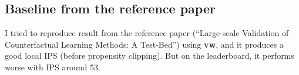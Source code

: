\documentclass[12pt]{article}
\begin{document}
\subsection{Baseline from the reference paper}
I tried to reproduce result from the reference paper (``Large-scale Validation of Counterfactual Learning Methods: A Test-Bed'') using \textbf{vw}, and it produces a good local IPS (before propensity clipping). But on the leaderboard, it performs worse with IPS around 53.
\end{document}
